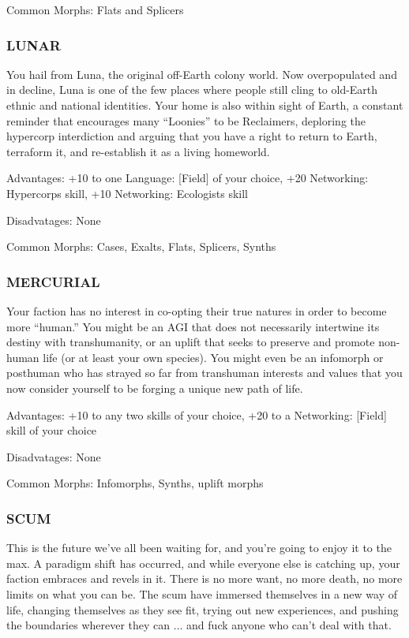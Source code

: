  Common Morphs: Flats and Splicers

\subsubsection{LUNAR}
You hail from Luna, the original off-Earth colony
world. Now overpopulated and in decline, Luna is
one of the few places where people still cling to old-Earth ethnic and national identities. Your home is also
within sight of Earth, a constant reminder that encourages many “Loonies” to be Reclaimers, deploring the
hypercorp interdiction and arguing that you have a
right to return to Earth, terraform it, and re-establish
it as a living homeworld.

 Advantages: +10 to one Language: [Field] of your
choice, +20 Networking: Hypercorps skill, +10
Networking: Ecologists skill

 Disadvatages: None

 Common Morphs: Cases, Exalts, Flats, Splicers,
Synths

\subsubsection{MERCURIAL}
Your faction has no interest in co-opting their true
natures in order to become more “human.” You might
be an AGI that does not necessarily intertwine its
destiny with transhumanity, or an uplift that seeks
to preserve and promote non-human life (or at least
your own species). You might even be an infomorph or
posthuman who has strayed so far from transhuman
interests and values that you now consider yourself to
be forging a unique new path of life.

 Advantages: +10 to any two skills of your choice, +20
to a Networking: [Field] skill of your choice

 Disadvatages: None

 Common Morphs: Infomorphs, Synths, uplift morphs

\subsubsection{SCUM}
This is the future we’ve all been waiting for, and you’re
going to enjoy it to the max. A paradigm shift has occurred, and while everyone else is catching up, your
faction embraces and revels in it. There is no more
want, no more death, no more limits on what you can
be. The scum have immersed themselves in a new way
of life, changing themselves as they see fit, trying out
new experiences, and pushing the boundaries wherever
they can ... and fuck anyone who can’t deal with that.

